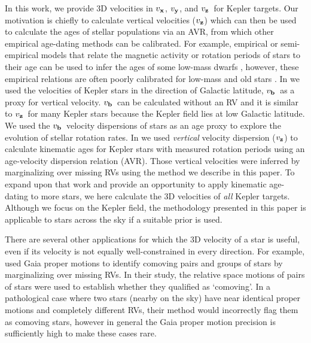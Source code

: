 \documentclass[]{aastex631}
\newcommand{\eg}{{\it e.g.}}
\newcommand{\vx}{$v_{\bf x}$}
\newcommand{\vy}{$v_{\bf y}$}
\newcommand{\vz}{$v_{\bf z}$}
\newcommand{\vb}{$v_{\bf b}$}
\begin{document}
In this work, we provide 3D velocities in \vx, \vy, and \vz\ for Kepler
targets.
Our motivation is chiefly to calculate vertical velocities (\vz) which can
then be used to calculate the ages of stellar populations via an AVR, from
which other empirical age-dating methods can be calibrated.
For example, empirical or semi-empirical models that relate the magnetic
activity or rotation periods of stars to their age can be used to infer the
ages of some low-mass dwarfs \citep[\eg][]{skumanich1972, barnes2003,
barnes2007, mamajek2008, matt2012, angus2019, claytor2020}, however, these
empirical relations are often poorly calibrated for low-mass and old stars
\citep[\eg][]{angus2015, vansaders2016, vansaders2018, metcalfe2019,
curtis2020, spada2019, angus2020}.
In \citet{angus2020} we used the velocities of Kepler stars in the direction
of Galactic latitude, \vb\, as a proxy for vertical velocity.
\vb\ can be calculated without an RV and it is similar to \vz\ for many Kepler
stars because the Kepler field lies at low Galactic latitude.
We used the \vb\ velocity dispersions of stars as an age proxy to explore the
evolution of stellar rotation rates.
In \citet{lu2021} we used {\it vertical} velocity dispersion (\vz) to
calculate kinematic ages for Kepler stars with measured rotation periods using
an age-velocity dispersion relation (AVR).
Those vertical velocities were inferred by marginalizing over missing RVs
using the method we describe in this paper.
To expand upon that work and provide an opportunity to apply kinematic
age-dating to more stars, we here calculate the 3D velocities of {\it all}
Kepler targets.
Although we focus on the Kepler field, the methodology presented in this paper
is applicable to stars across the sky if a suitable prior is used.

There are several other applications for which the 3D velocity of a star is
useful, even if its velocity is not equally well-constrained in every
direction.
For example, \citet{oh2017} used Gaia proper motions to identify comoving
pairs and groups of stars by marginalizing over missing RVs.
In their study, the relative space motions of pairs of stars were used to
establish whether they qualified as `comoving'.
In a pathological case where two stars (nearby on the sky) have near identical
proper motions and completely different RVs, their method would incorrectly
flag them as comoving stars, however in general the Gaia proper motion
precision is sufficiently high to make these cases rare.
\end{document}
